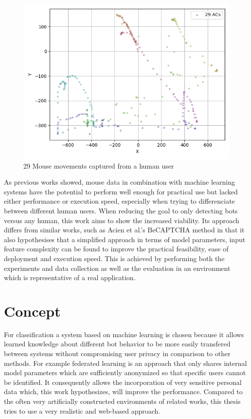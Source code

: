 \documentclass[
    fontsize=12pt,
    headings=small,
    parskip=half,           %
    bibliography=totoc,
    numbers=noenddot,       %
    open=any,               %
    final                   %
]{scrreprt}
\begin{document}
\begin{figure}[h]
	\includegraphics[width=\textwidth]{figures/user_mouse_heatmap.png}
	\caption{29 Mouse movements captured from a human user}
	\label{fig:user_mouse_heatmap}
\end{figure}

As previous works showed, mouse data in combination with machine learning systems have the potential to perform well enough for practical use but lacked either performance or execution speed, especially when trying to differenciate between different human users. When reducing the goal to only detecting bots versus any human, this work aims to show the increased viability. Its approach differs from similar works, such as Acien et al.'s BeCAPTCHA method \cite{Acien2020BeCAPTCHAMouseSM} in that it also hypothesises that a simplified approach in terms of model parameters, input feature complexity can be found to improve the practical feasibility, ease of deployment and execution speed. This is achieved by performing both the experiments and data collection as well as the evaluation in an environment which is representative of a real application.


\section{Concept}

For classification a system based on machine learning is chosen because it allows learned knowledge about different bot behavior to be more easily transfered between systems without compromising user privacy in comparison to other methods. For example federated learning \cite{DBLP:journals/corr/KonecnyMR15} \cite{DBLP:journals/corr/KonecnyMRR16} is an approach that only shares internal model parameters which are sufficiently anonymized so that specific users cannot be identified. It consequently allows the incorporation of very sensitive personal data which, this work hypothesizes, will improve the performance. Compared to the often very artificially constructed environments of related works, this thesis tries to use a very realistic and web-based approach.
\end{document}

